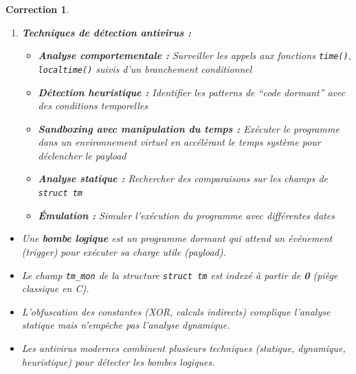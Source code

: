 \documentclass[a4paper,11pt]{article}
\theoremstyle{plain}
\newtheorem{correction}{Correction}
\theoremstyle{definition}
\begin{document}
\begin{correction}
\begin{enumerate}
\item \textbf{Techniques de détection antivirus :}

\begin{itemize}
\item \textbf{Analyse comportementale :} Surveiller les appels aux fonctions \texttt{time()}, \texttt{localtime()} suivis d'un branchement conditionnel
\item \textbf{Détection heuristique :} Identifier les patterns de ``code dormant'' avec des conditions temporelles
\item \textbf{Sandboxing avec manipulation du temps :} Exécuter le programme dans un environnement virtuel en accélérant le temps système pour déclencher le payload
\item \textbf{Analyse statique :} Rechercher des comparaisons sur les champs de \texttt{struct tm}
\item \textbf{Émulation :} Simuler l'exécution du programme avec différentes dates
\end{itemize}

\end{enumerate}

\begin{pointcle}
\begin{itemize}
    \item Une \textbf{bombe logique} est un programme dormant qui attend un événement (\textit{trigger}) pour exécuter sa charge utile (\textit{payload}).
    \item Le champ \texttt{tm\_mon} de la structure \texttt{struct tm} est indexé à partir de \textbf{0} (piège classique en C).
    \item L'obfuscation des constantes (XOR, calculs indirects) complique l'analyse statique mais n'empêche pas l'analyse dynamique.
    \item Les antivirus modernes combinent plusieurs techniques (statique, dynamique, heuristique) pour détecter les bombes logiques.
\end{itemize}
\end{pointcle}

\end{correction}

\bigskip

\end{document}
